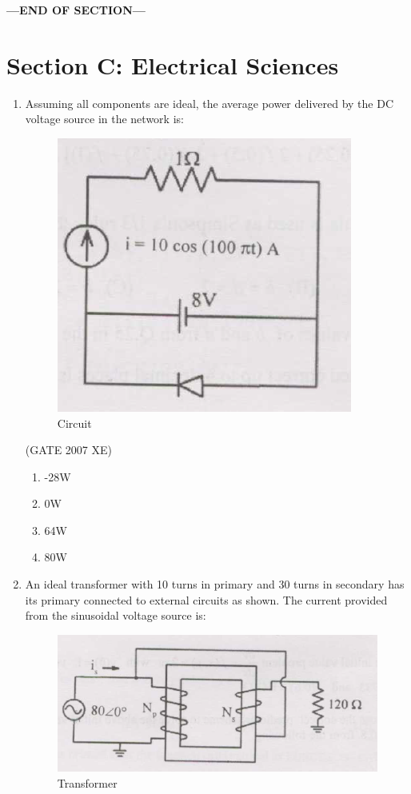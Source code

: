 \documentclass[journal,cmex10]{IEEEtran}
\theoremstyle{remark}
\numberwithin{equation}{enumi}
\numberwithin{figure}{enumi}
\begin{document}
    \vspace{3\baselineskip}
    \begin{center}
    \textbf{\Large ---END OF SECTION---}
    \end{center}

\newpage

\section*{Section C: Electrical Sciences}
\vspace{2\baselineskip}
\begin{enumerate}

    \item Assuming all components are ideal, the average power delivered by the DC voltage source in the network is:
    
    \begin{figure}[htbp]
  \centering
  \includegraphics[width=0.6\columnwidth]{figs/C/fig1.png}
  \caption{Circuit}
  \label{fig:C/figs1.png}
\end{figure}
    \hfill{(GATE 2007 XE)}
    \begin{multicols}{4}
    \begin{enumerate}
        \item -28W
        \item 0W
        \item 64W
        \item 80W
    \end{enumerate}
    \end{multicols}
    \newpage

    \item An ideal transformer with 10 turns in primary and 30 turns in secondary has its primary connected to external circuits as shown. The current provided from the sinusoidal voltage source is:
    \begin{figure}[htbp]
  \centering
  \includegraphics[width=0.6\columnwidth]{figs/C/fig2.png}
  \caption{Transformer}
  \label{fig:C/figs2.png}
\end{figure}


\end{enumerate}
\end{document}
